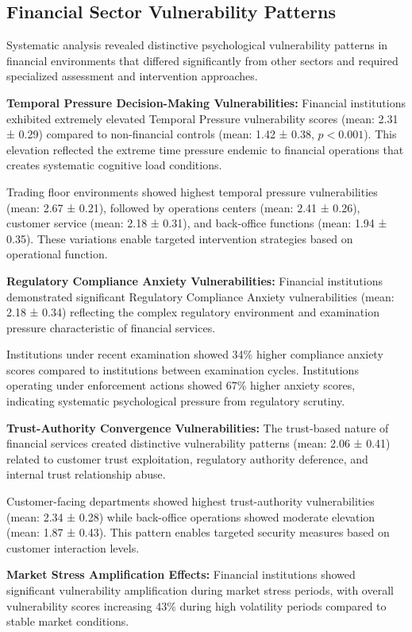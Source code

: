 \documentclass[10pt, twocolumn]{article}
\begin{document}
\subsection{Financial Sector Vulnerability Patterns}

Systematic analysis revealed distinctive psychological vulnerability patterns in financial environments that differed significantly from other sectors and required specialized assessment and intervention approaches.

\textbf{Temporal Pressure Decision-Making Vulnerabilities:} Financial institutions exhibited extremely elevated Temporal Pressure vulnerability scores (mean: 2.31 ± 0.29) compared to non-financial controls (mean: 1.42 ± 0.38, $p < 0.001$). This elevation reflected the extreme time pressure endemic to financial operations that creates systematic cognitive load conditions.

Trading floor environments showed highest temporal pressure vulnerabilities (mean: 2.67 ± 0.21), followed by operations centers (mean: 2.41 ± 0.26), customer service (mean: 2.18 ± 0.31), and back-office functions (mean: 1.94 ± 0.35). These variations enable targeted intervention strategies based on operational function.

\textbf{Regulatory Compliance Anxiety Vulnerabilities:} Financial institutions demonstrated significant Regulatory Compliance Anxiety vulnerabilities (mean: 2.18 ± 0.34) reflecting the complex regulatory environment and examination pressure characteristic of financial services.

Institutions under recent examination showed 34\% higher compliance anxiety scores compared to institutions between examination cycles. Institutions operating under enforcement actions showed 67\% higher anxiety scores, indicating systematic psychological pressure from regulatory scrutiny.

\textbf{Trust-Authority Convergence Vulnerabilities:} The trust-based nature of financial services created distinctive vulnerability patterns (mean: 2.06 ± 0.41) related to customer trust exploitation, regulatory authority deference, and internal trust relationship abuse.

Customer-facing departments showed highest trust-authority vulnerabilities (mean: 2.34 ± 0.28) while back-office operations showed moderate elevation (mean: 1.87 ± 0.43). This pattern enables targeted security measures based on customer interaction levels.

\textbf{Market Stress Amplification Effects:} Financial institutions showed significant vulnerability amplification during market stress periods, with overall vulnerability scores increasing 43\% during high volatility periods compared to stable market conditions.
\end{document}
